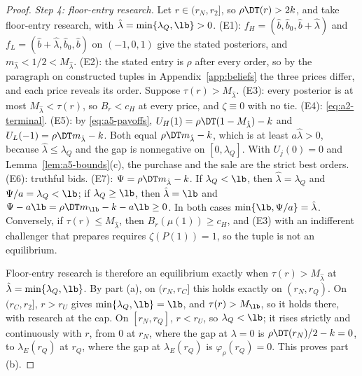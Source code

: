 \begin{proof}
\emph{Step 4: floor-entry research.} Let \(r\in(r_N,r_2]\), so \(\rho\DT(r)>2k\), and take floor-entry research,
with \(\hat\lambda=\min\{\lambda_Q,\lb\}>0\). (E1): \(f_H=(\hat b,\hat b_0,\hat b+\hat\lambda)\) and
\(f_L=(\hat b+\hat\lambda,\hat b_0,\hat b)\) on \((-1,0,1)\) give the stated posteriors, and
\(m_{\hat\lambda}<1/2<M_{\hat\lambda}\). (E2): the stated entry is \(\rho\) after every order, so by the paragraph
on constructed tuples in Appendix~\ref{app:beliefs} the three prices differ, and each price reveals its order.
Suppose \(\tau(r)>M_{\hat\lambda}\). (E3): every posterior is at most \(M_{\hat\lambda}<\tau(r)\), so \(B_r<c_H\) at
every price, and \(\zeta\equiv0\) with no tie. (E4): \eqref{eq:a2-terminal}. (E5): by \eqref{eq:a5-payoffs},
\(U_H(1)=\rho\DT(1-M_{\hat\lambda})-k\) and \(U_L(-1)=\rho\DT m_{\hat\lambda}-k\). Both equal
\(\rho\DT m_{\hat\lambda}-k\), which is at least \(a\hat\lambda>0\), because \(\hat\lambda\le\lambda_Q\) and the gap is
nonnegative on \([0,\lambda_Q]\). With \(U_j(0)=0\) and Lemma~\ref{lem:a5-bounds}(c), the purchase and the sale are
the strict best orders. (E6): truthful bids. (E7): \(\Psi=\rho\DT m_{\hat\lambda}-k\). If \(\lambda_Q<\lb\), then
\(\hat\lambda=\lambda_Q\) and \(\Psi/a=\lambda_Q<\lb\); if \(\lambda_Q\ge\lb\), then \(\hat\lambda=\lb\) and
\(\Psi-a\lb=\rho\DT m_{\lb}-k-a\lb\ge0\). In both cases \(\min\{\lb,\Psi/a\}=\hat\lambda\). Conversely, if
\(\tau(r)\le M_{\hat\lambda}\), then \(B_r(\mu(1))\ge c_H\), and (E3) with an indifferent challenger that prepares
requires \(\zeta(P(1))=1\), so the tuple is not an equilibrium.

Floor-entry research is therefore an equilibrium exactly when \(\tau(r)>M_{\hat\lambda}\) at
\(\hat\lambda=\min\{\lambda_Q,\lb\}\). By part (a), on \((r_N,r_C]\) this holds exactly on \((r_N,r_Q)\). On
\((r_C,r_2]\), \(r>r_U\) gives \(\min\{\lambda_Q,\lb\}=\lb\), and \(\tau(r)>M_{\lb}\), so it holds there, with research
at the cap. On \([r_N,r_Q]\), \(r<r_U\), so \(\lambda_Q<\lb\); it rises strictly and continuously with \(r\), from \(0\)
at \(r_N\), where the gap at \(\lambda=0\) is \(\rho\DT(r_N)/2-k=0\), to \(\lambda_E(r_Q)\) at \(r_Q\), where the gap
at \(\lambda_E(r_Q)\) is \(\varphi_\rho(r_Q)=0\). This proves part (b).


\end{proof}
